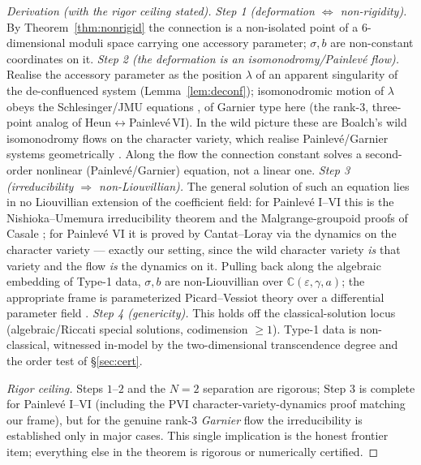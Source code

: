 \documentclass[11pt]{article}
\theoremstyle{definition}
\theoremstyle{remark}
\newcommand{\eps}{\varepsilon}
\newcommand{\C}{\mathbb{C}}
\begin{document}
\begin{proof}[Derivation (with the rigor ceiling stated)]
\emph{Step 1 (deformation $\Leftrightarrow$ non-rigidity).} By Theorem~\ref{thm:nonrigid} the
connection is a non-isolated point of a $6$-dimensional moduli space carrying one accessory
parameter; $\sigma,b$ are non-constant coordinates on it.
\emph{Step 2 (the deformation is an isomonodromy/Painlev\'e flow).} Realise the accessory
parameter as the position $\lambda$ of an apparent singularity of the de-confluenced system
(Lemma~\ref{lem:deconf}); isomonodromic motion of $\lambda$ obeys the Schlesinger/JMU
equations \cite{JMU1981}, of Garnier type here (the rank-$3$, three-point analog of
Heun$\leftrightarrow$Painlev\'e\,VI). In the wild picture these are Boalch's wild isomonodromy
flows on the character variety, which realise Painlev\'e/Garnier systems geometrically
\cite{Boalch2001,Boalch2007}. Along the flow the connection constant solves a second-order
nonlinear (Painlev\'e/Garnier) equation, not a linear one.
\emph{Step 3 (irreducibility $\Rightarrow$ non-Liouvillian).} The general solution of such an
equation lies in no Liouvillian extension of the coefficient field: for Painlev\'e I--VI this
is the Nishioka--Umemura irreducibility theorem \cite{Nishioka1988,Umemura1990} and the
Malgrange-groupoid proofs of Casale \cite{Casale2008}; for Painlev\'e VI it is proved by
Cantat--Loray via the dynamics on the character variety \cite{CL2009} --- exactly our setting,
since the wild character variety \emph{is} that variety and the flow \emph{is} the dynamics
on it. Pulling back along the algebraic embedding of Type-1 data, $\sigma,b$ are
non-Liouvillian over $\C(\eps,\gamma,a)$; the appropriate frame is parameterized
Picard--Vessiot theory over a differential parameter field \cite{CS2007}.
\emph{Step 4 (genericity).} This holds off the classical-solution locus (algebraic/Riccati
special solutions, codimension $\ge1$). Type-1 data is non-classical, witnessed in-model by
the two-dimensional transcendence degree and the order test of \S\ref{sec:cert}.

\emph{Rigor ceiling.} Steps $1$--$2$ and the $N{=}2$ separation are rigorous; Step $3$ is
complete for Painlev\'e I--VI (including the PVI character-variety-dynamics proof matching our
frame), but for the genuine rank-$3$ \emph{Garnier} flow the irreducibility is established
only in major cases. This single implication is the honest frontier item; everything else in
the theorem is rigorous or numerically certified.
\end{proof}
\end{document}
